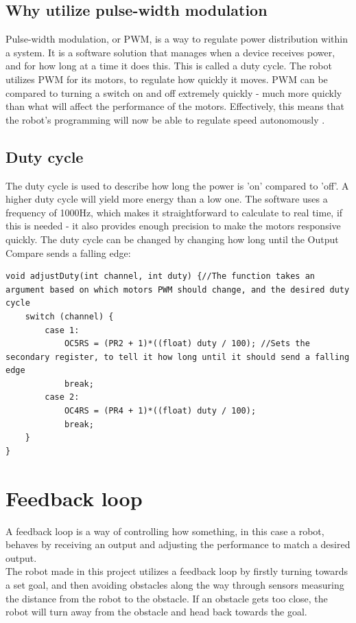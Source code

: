 \subsection {Why utilize pulse-width modulation}

Pulse-width modulation, or PWM, is a way to regulate power distribution within a system. It is a software solution that manages when a device receives power, and for how long at a time it does this. This is called a duty cycle. The robot utilizes PWM for its motors, to regulate how quickly it moves. PWM can be compared to turning a switch on and off extremely quickly - much more quickly than what will affect the performance of the motors. Effectively, this means that the robot's programming will now be able to regulate speed autonomously . 
 
\subsection {Duty cycle}

The duty cycle is used to describe how long the power is 'on' compared to 'off'. A higher duty cycle will yield more energy than a low one. The software uses a frequency of 1000Hz, which makes it straightforward to calculate to real time, if this is needed - it also provides enough precision to make the motors responsive quickly.
The duty cycle can be changed by changing how long until the Output Compare sends a falling edge:

\begin{lstlisting}
void adjustDuty(int channel, int duty) {//The function takes an argument based on which motors PWM should change, and the desired duty cycle
    switch (channel) { 
        case 1:
            OC5RS = (PR2 + 1)*((float) duty / 100); //Sets the secondary register, to tell it how long until it should send a falling edge
            break;
        case 2:
            OC4RS = (PR4 + 1)*((float) duty / 100);
            break;
    }
}
\end{lstlisting}

\section{Feedback loop}
A feedback loop is a way of controlling how something, in this case a robot, behaves by receiving an output and adjusting the performance to match a desired output.\\
The robot made in this project utilizes a feedback loop by firstly turning towards a set goal, and then avoiding obstacles along the way through sensors measuring the distance from the robot to the obstacle. If an obstacle gets too close, the robot will turn away from the obstacle and head back towards the goal.
